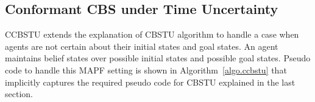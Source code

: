 \documentclass{article}
\begin{document}
\subsection{Conformant CBS under Time Uncertainty}
CCBSTU extends the explanation of CBSTU algorithm to handle a case when agents are not certain about their initial states and goal states. 
An agent maintains belief states over possible initial states and possible goal states. 
%
%
%
Pseudo code to handle this MAPF setting is shown in Algorithm~\ref{algo.ccbstu} that implicitly captures the required pseudo code for CBSTU explained in the last section.
%
%
%
\end{document}

